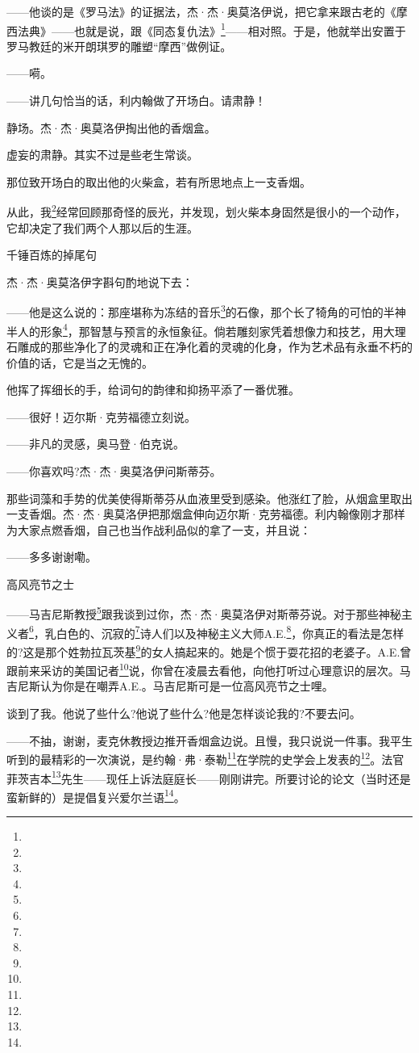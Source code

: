 \par ——他谈的是《罗马法》的证据法，杰·杰·奥莫洛伊说，把它拿来跟古老的《摩西法典》——也就是说，跟《同态复仇法》\footnote{}——相对照。于是，他就举出安置于罗马教廷的米开朗琪罗的雕塑“摩西”做例证。
\par ——嗬。
\par ——讲几句恰当的话，利内翰做了开场白。请肃静！
\par 静场。杰·杰·奥莫洛伊掏出他的香烟盒。
\par 虚妄的肃静。其实不过是些老生常谈。
\par 那位致开场白的取出他的火柴盒，若有所思地点上一支香烟。
\par 从此，我\footnote{}经常回顾那奇怪的辰光，并发现，划火柴本身固然是很小的一个动作，它却决定了我们两个人那以后的生涯。
\par 千锤百炼的掉尾句
\par 杰·杰·奥莫洛伊字斟句酌地说下去：
\par ——他是这么说的：那座堪称为冻结的音乐\footnote{}的石像，那个长了犄角的可怕的半神半人的形象\footnote{}，那智慧与预言的永恒象征。倘若雕刻家凭着想像力和技艺，用大理石雕成的那些净化了的灵魂和正在净化着的灵魂的化身，作为艺术品有永垂不朽的价值的话，它是当之无愧的。
\par 他挥了挥细长的手，给词句的韵律和抑扬平添了一番优雅。
\par ——很好！迈尔斯·克劳福德立刻说。
\par ——非凡的灵感，奥马登·伯克说。
\par ——你喜欢吗?杰·杰·奥莫洛伊问斯蒂芬。
\par 那些词藻和手势的优美使得斯蒂芬从血液里受到感染。他涨红了脸，从烟盒里取出一支香烟。杰·杰·奥莫洛伊把那烟盒伸向迈尔斯·克劳福德。利内翰像刚才那样为大家点燃香烟，自己也当作战利品似的拿了一支，并且说：
\par ——多多谢谢嘞。
\par 高风亮节之士
\par ——马吉尼斯教授\footnote{}跟我谈到过你，杰·杰·奥莫洛伊对斯蒂芬说。对于那些神秘主义者\footnote{}，乳白色的、沉寂的\footnote{}诗人们以及神秘主义大师A.E.\footnote{}，你真正的看法是怎样的?这是那个姓勃拉瓦茨基\footnote{}的女人搞起来的。她是个惯于耍花招的老婆子。A.E.曾跟前来采访的美国记者\footnote{}说，你曾在凌晨去看他，向他打听过心理意识的层次。马吉尼斯认为你是在嘲弄A.E.。马吉尼斯可是一位高风亮节之士哩。
\par 谈到了我。他说了些什么?他说了些什么?他是怎样谈论我的?不要去问。
\par ——不抽，谢谢，麦克休教授边推开香烟盒边说。且慢，我只说说一件事。我平生听到的最精彩的一次演说，是约翰·弗·泰勒\footnote{}在学院的史学会上发表的\footnote{}。法官菲茨吉本\footnote{}先生——现任上诉法庭庭长——刚刚讲完。所要讨论的论文（当时还是蛮新鲜的）是提倡复兴爱尔兰语\footnote{}。
